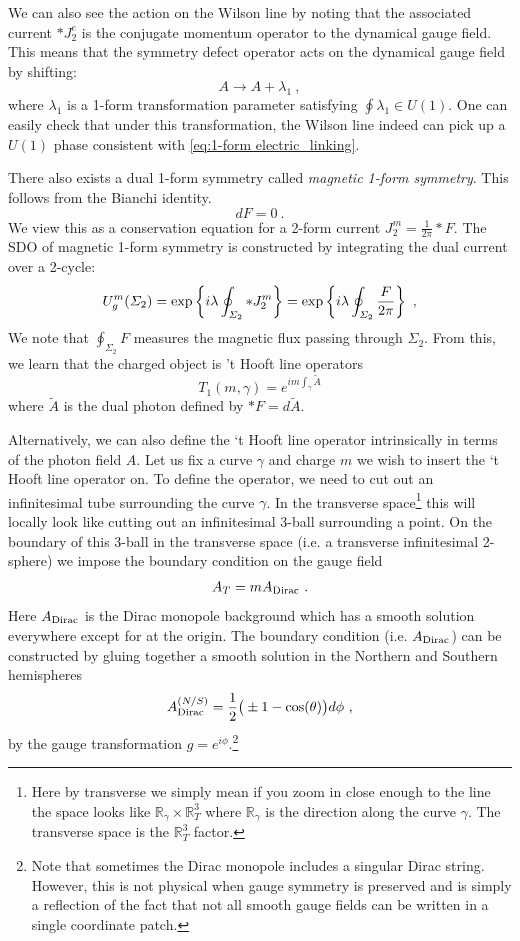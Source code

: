 \documentclass[11pt]{article}
\newcommand{\eq}[1]{\begin{align}\begin{split}#1\end{split}\end{align}}
\def\exp{{\rm exp}}
\def\half{\frac{1}{2}}
\def\IR{{\mathbb{R}}}
\def\beq{\begin{equation}}
\def\eeq{\end{equation}}
\begin{document}
We can also see the action on the Wilson line by noting that the associated current $\ast J_2^e$ is the conjugate momentum operator to the dynamical gauge field. This means that the symmetry defect operator acts on the dynamical gauge field by shifting:
%
\beq\label{Ashift}
A \to A + \lambda_1~,
\eeq
%
where $\lambda_1$ is a 1-form transformation parameter satisfying $\oint \lambda_1 \in U(1)$. One can easily check that under this transformation, the Wilson line indeed can pick up a $U(1)$ phase consistent with \eqref{eq:1-form electric_linking}. 

There also exists a dual 1-form symmetry called \emph{magnetic 1-form symmetry}. This follows from the Bianchi identity.
%
\beq
d F =0~.
\eeq
%
We view this as a conservation equation for a 2-form current $J_2^m = \frac{1}{2\pi} \ast  F$. The SDO of magnetic 1-form symmetry is constructed by integrating the dual current over a 2-cycle:  
%
\beq
U_g^m (\Sigma_2) = \exp\left\{i \lambda \oint_{\Sigma_2} \ast  J_2^m\right\} = \exp\left\{ i\lambda \oint_{\Sigma_2} \frac{F}{2\pi}\right\}~,
\eeq
%
We note that $\oint_{\Sigma_2} F$ measures the magnetic flux passing through $\Sigma_2$. From this, we learn that the charged object is 't Hooft line operators%
%
\beq
T_1 (m, \gamma) = e^{i m  \int_\gamma \tilde{A}}
\eeq
%
where $\tilde{A}$ is the dual photon defined by $\ast  F = d \tilde{A}$. 

Alternatively, we can also define the `t Hooft line operator intrinsically in terms of the photon field $A$. 
Let us fix a curve $\gamma$ and charge $m$ we wish to insert the `t Hooft line operator on. To define the operator, we need to cut out an infinitesimal tube surrounding the curve $\gamma$. In the transverse space\footnote{Here by transverse we simply mean if you zoom in close enough to the line the space looks like $\IR_\gamma\times \IR_T^3$ where $\IR_\gamma$ is the direction along the curve $\gamma$. The transverse space is the $\IR_T^3$ factor. } this will locally look like cutting out an infinitesimal 3-ball surrounding a point. On the boundary of this 3-ball  in the transverse space (i.e. a transverse infinitesimal 2-sphere) we impose the boundary condition on the gauge field 
\eq{
A_T=m A_{\rm Dirac}~. 
}
Here $A_{\rm Dirac}$ is the Dirac monopole background which has a smooth solution everywhere except for at the origin. The boundary condition (i.e. $A_{\rm Dirac}$) can be constructed by gluing together a smooth solution in the Northern and Southern hemispheres
\eq{
A_{\rm Dirac}^{(N/S)}=\half\big(\pm1-\cos(\theta)\big)d\phi~,
}
by the gauge transformation $g=e^{ i \phi}$.\footnote{Note that sometimes the Dirac monopole includes a singular Dirac string. However, this is not physical when gauge symmetry is preserved and is simply a reflection of the fact that not all smooth gauge fields can be written in a single coordinate patch. }
\end{document}
